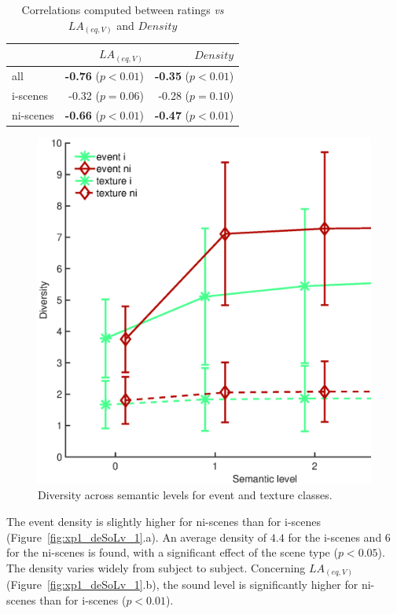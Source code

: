 \documentclass[twoside,twocolumn]{article}
\begin{document}
\begin{table}[t]
\centering
\begin{tabular}{l r r} 
                & $LA_{(eq,V)}$    & $Density$    \\
\hline
all             & \textbf{-0.76} ($p<0.01$)    & \textbf{-0.35} ($p<0.01$) \\
i-scenes        & -0.32 ($p=0.06$)    & -0.28 ($p=0.10$) \\
ni-scenes       & \textbf{-0.66} ($p<0.01$)    & \textbf{-0.47} ($p<0.01$) \\

\hline
\end{tabular}
\vspace{0.5mm}
\caption{\label{tab:numGlobal} Correlations computed between ratings \emph{vs} $LA_{(eq,V)}$ and $Density$}
\end{table}

\begin{figure}[t!]
\centering
\includegraphics[width=.4\paperwidth]{../gfxMatlab/xp1_div_1.eps} 
\caption{\label{fig:analyseDensitySnrGlobal3} Diversity across semantic levels for event and texture classes.}
\end{figure}

The event density is slightly higher for ni-scenes than for i-scenes (Figure~\ref{fig:xp1_deSoLv_1}.a). An average density of $4.4$ for the i-scenes and $6$ for the ni-scenes is found, with a significant effect of the scene type ($p<0.05$). The density varies widely from subject to subject. Concerning $LA_{(eq,V)}$ (Figure~\ref{fig:xp1_deSoLv_1}.b), the  sound level is significantly higher for ni-scenes than for i-scenes ($p<0.01$). 
\end{document}
